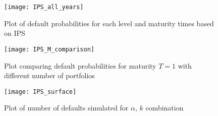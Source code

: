 \begin{figure}
    \centering
    \texttt{[image: IPS\_all\_years]}
    \caption{Plot of default probabilities for each level and maturity times
    based on IPS}
    \label{fig:IPS_all}
\end{figure}

\begin{figure}
    \centering
    \texttt{[image: IPS\_M\_comparison]}
    \caption{Plot comparing default probabilities for maturity $T=1$ with
        different number of portfolios}
    \label{fig:IPS_comparison}
\end{figure}

\begin{figure}
    \centering
    \texttt{[image: IPS\_surface]}
    \caption{Plot of number of defaults simulated for $\alpha$, $k$ combination}
    \label{fig:IPS_surface}
\end{figure}

